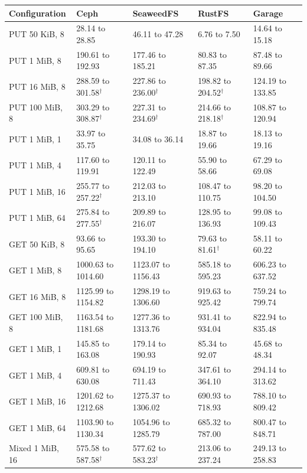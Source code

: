 \begin{tabular}{lllll}
\toprule
Configuration & Ceph & SeaweedFS & RustFS & Garage \\
\midrule
PUT 50 KiB, 8 & 28.14 to 28.85 & 46.11 to 47.28 & 6.76 to 7.50 & 14.64 to 15.18 \\
PUT 1 MiB, 8 & 190.61 to 192.93 & 177.46 to 185.21 & 80.83 to 87.35 & 87.48 to 89.66 \\
PUT 16 MiB, 8 & 288.59 to 301.58$^{\dagger}$ & 227.86 to 236.00$^{\dagger}$ & 198.82 to 204.52$^{\dagger}$ & 124.19 to 133.85 \\
PUT 100 MiB, 8 & 303.29 to 308.87$^{\dagger}$ & 227.31 to 234.69$^{\dagger}$ & 214.66 to 218.18$^{\dagger}$ & 108.87 to 120.94 \\
\midrule
PUT 1 MiB, 1 & 33.97 to 35.75 & 34.08 to 36.14 & 18.87 to 19.66 & 18.13 to 19.16 \\
PUT 1 MiB, 4 & 117.60 to 119.91 & 120.11 to 122.49 & 55.90 to 58.66 & 67.29 to 69.08 \\
PUT 1 MiB, 16 & 255.77 to 257.22$^{\dagger}$ & 212.03 to 213.10 & 108.47 to 110.75 & 98.20 to 104.50 \\
PUT 1 MiB, 64 & 275.84 to 277.55$^{\dagger}$ & 209.89 to 216.07 & 128.95 to 136.93 & 99.08 to 109.43 \\
\midrule
GET 50 KiB, 8 & 93.66 to 95.65 & 193.30 to 194.10 & 79.63 to 81.61$^{\dagger}$ & 58.11 to 60.22 \\
GET 1 MiB, 8 & 1000.63 to 1014.60 & 1123.07 to 1156.43 & 585.18 to 595.23 & 606.23 to 637.52 \\
GET 16 MiB, 8 & 1125.99 to 1154.82 & 1298.19 to 1306.60 & 919.63 to 925.42 & 759.24 to 799.74 \\
GET 100 MiB, 8 & 1163.54 to 1181.68 & 1277.36 to 1313.76 & 931.41 to 934.04 & 822.94 to 835.48 \\
\midrule
GET 1 MiB, 1 & 145.85 to 163.08 & 179.14 to 190.93 & 85.34 to 92.07 & 45.68 to 48.34 \\
GET 1 MiB, 4 & 609.81 to 630.08 & 694.19 to 711.43 & 347.61 to 364.10 & 294.14 to 313.62 \\
GET 1 MiB, 16 & 1201.62 to 1212.68 & 1275.37 to 1306.02 & 690.93 to 718.93 & 788.10 to 809.42 \\
GET 1 MiB, 64 & 1103.90 to 1130.34 & 1054.96 to 1285.79 & 685.32 to 787.00 & 800.47 to 848.71 \\
\midrule
Mixed 1 MiB, 16 & 575.58 to 587.58$^{\dagger}$ & 577.62 to 583.23$^{\dagger}$ & 213.06 to 237.24 & 249.13 to 258.83 \\
\bottomrule
\end{tabular}
